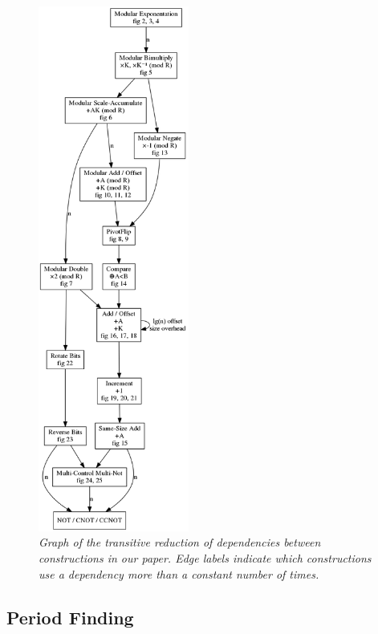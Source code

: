 \documentclass[twocolumn]{article}
\begin{document}
\begin{figure}
  \centering
  \includegraphics[height=17.3cm]{assets/dependencies.png}
  \caption{\em
    Graph of the transitive reduction of dependencies between constructions in our paper.
    Edge labels indicate which constructions use a dependency more than a constant number of times.
  }
  \label{fig:dependencies}
\end{figure}

\subsection{Period Finding}
\end{document}
